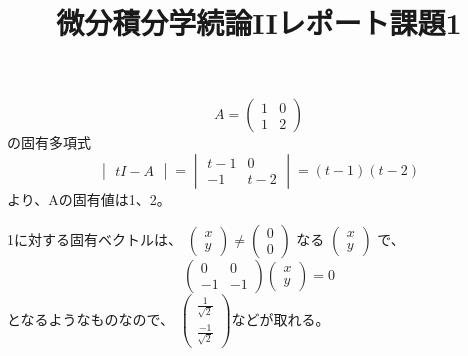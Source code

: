 \documentclass[12pt,a4]{article}
\title{微分積分学続論IIレポート課題1}
\date{}
\begin{document}
\maketitle

\begin{equation}
  A=
  \begin{pmatrix}
    1 & 0 \\
    1 & 2
  \end{pmatrix}
\end{equation}
の固有多項式
\begin{equation}
  \begin{vmatrix}
    tI-A
  \end{vmatrix}
  =
  \begin{vmatrix}
    t - 1 & 0 \\
    -1    & t - 2
  \end{vmatrix}
  = (t-1)(t-2)
\end{equation}
より、Aの固有値は1、2。

1に対する固有ベクトルは、
$
\left(
\begin{array}{c}
  x \\
  y
\end{array}
\right)
\neq
\left(
\begin{array}{c}
  0 \\
  0
\end{array}
\right)
$
なる
$
\left(
\begin{array}{c}
  x \\
  y
\end{array}
\right)
$ で、
\begin{equation}
  \begin{pmatrix}
    0 & 0 \\
    -1 & -1
  \end{pmatrix}
  \left(
  \begin{array}{c}
    x \\
    y
  \end{array}
  \right)
  = 0
\end{equation}
となるようなものなので、
$
\left(
\begin{array}{c}
  \frac{1}{\sqrt{2}}\\
  \frac{-1}{\sqrt{2}}
\end{array}
\right)
$などが取れる。
\end{document}
